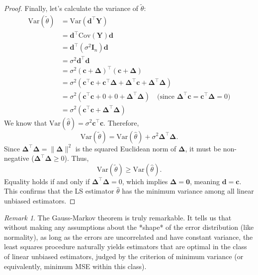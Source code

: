 \documentclass[11pt, letterpaper]{article}
\theoremstyle{plain} %
\theoremstyle{definition} %
\theoremstyle{remark} %
\newtheorem{remark}[theorem]{Remark}
\renewcommand{\mathbf}{\boldsymbol} %
\newcommand{\V}{\mathrm{Var}} %
\newcommand{\Cov}{\mathrm{Cov}} %
\newcommand{\I}{\mathbf{I}} %
\begin{document}
\begin{proof}
Finally, let's calculate the variance of $\tilde{\theta}$:
\begin{align*}
\V(\tilde{\theta}) &= \V(\boldsymbol{d}^{\top}\boldsymbol{Y}) \\
&= \boldsymbol{d}^{\top} \Cov(\boldsymbol{Y}) \boldsymbol{d} \\
&= \boldsymbol{d}^{\top} (\sigma^2 \I_n) \boldsymbol{d} \\
&= \sigma^2 \boldsymbol{d}^{\top}\boldsymbol{d} \\
&= \sigma^2 (\boldsymbol{c} + \boldsymbol{\Delta})^{\top}(\boldsymbol{c} + \boldsymbol{\Delta}) \\
&= \sigma^2 (\boldsymbol{c}^{\top}\boldsymbol{c} + \boldsymbol{c}^{\top}\boldsymbol{\Delta} + \boldsymbol{\Delta}^{\top}\boldsymbol{c} + \boldsymbol{\Delta}^{\top}\boldsymbol{\Delta}) \\
&= \sigma^2 (\boldsymbol{c}^{\top}\boldsymbol{c} + 0 + 0 + \boldsymbol{\Delta}^{\top}\boldsymbol{\Delta}) \quad \text{(since } \boldsymbol{\Delta}^{\top}\boldsymbol{c} = \boldsymbol{c}^{\top}\boldsymbol{\Delta} = 0) \\
&= \sigma^2 (\boldsymbol{c}^{\top}\boldsymbol{c} + \boldsymbol{\Delta}^{\top}\boldsymbol{\Delta})
\end{align*}
We know that $\V(\hat{\theta}) = \sigma^2 \boldsymbol{c}^{\top}\boldsymbol{c}$. Therefore,
\[
\V(\tilde{\theta}) = \V(\hat{\theta}) + \sigma^2 \boldsymbol{\Delta}^{\top}\boldsymbol{\Delta}.
\]
Since $\boldsymbol{\Delta}^{\top}\boldsymbol{\Delta} = \|\boldsymbol{\Delta}\|^2$ is the squared Euclidean norm of $\boldsymbol{\Delta}$, it must be non-negative ($\boldsymbol{\Delta}^{\top}\boldsymbol{\Delta} \ge 0$). Thus,
\[
\V(\tilde{\theta}) \ge \V(\hat{\theta}).
\]
Equality holds if and only if $\boldsymbol{\Delta}^{\top}\boldsymbol{\Delta} = 0$, which implies $\boldsymbol{\Delta} = \mathbf{0}$, meaning $\boldsymbol{d} = \boldsymbol{c}$. This confirms that the LS estimator $\hat{\theta}$ has the minimum variance among all linear unbiased estimators.
\end{proof}

\begin{remark}
The Gauss-Markov theorem is truly remarkable. It tells us that without making any assumptions about the *shape* of the error distribution (like normality), as long as the errors are uncorrelated and have constant variance, the least squares procedure naturally yields estimators that are optimal in the class of linear unbiased estimators, judged by the criterion of minimum variance (or equivalently, minimum MSE within this class).
\end{remark}
\end{document}
